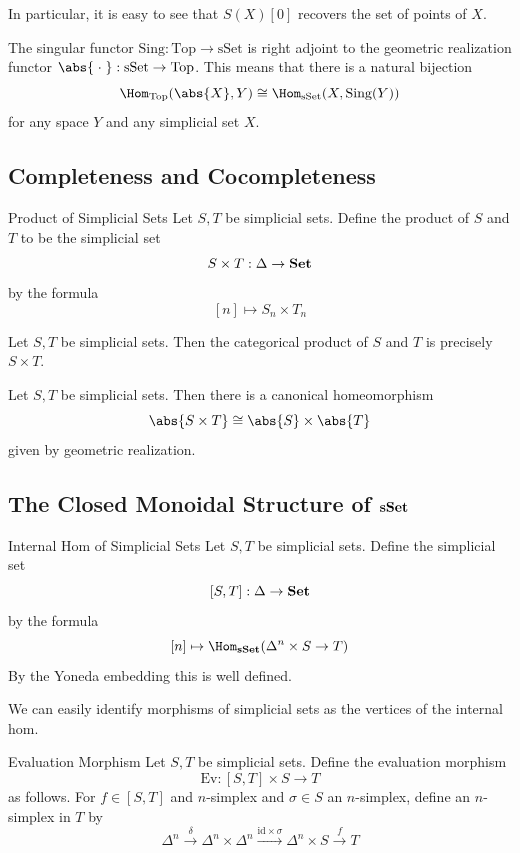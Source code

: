 \documentclass[a4paper]{article}
\begin{document}
In particular, it is easy to see that $S(X)[0]$ recovers the set of points of $X$. 

\begin{thm}{}{} The singular functor $\text{Sing}:\text{Top}\to\text{sSet}$ is right adjoint to the geometric realization functor $\abs{\;\cdot\;}:\text{sSet}\to\text{Top}$. This means that there is a natural bijection $$\Hom_\text{Top}(\abs{X},Y)\cong\Hom_\text{sSet}(X,\text{Sing}(Y))$$ for any space $Y$ and any simplicial set $X$. 
\end{thm}

\subsection{Completeness and Cocompleteness}
\begin{defn}{Product of Simplicial Sets}{} Let $S,T$ be simplicial sets. Define the product of $S$ and $T$ to be the simplicial set $$S\times T:\Delta\to\bold{Set}$$ by the formula $$[n]\mapsto S_n\times T_n$$
\end{defn}

\begin{prp}{}{} Let $S,T$ be simplicial sets. Then the categorical product of $S$ and $T$ is precisely $S\times T$. 
\end{prp}

\begin{lmm}{}{} Let $S,T$ be simplicial sets. Then there is a canonical homeomorphism $$\abs{S\times T}\cong\abs{S}\times\abs{T}$$ given by geometric realization. 
\end{lmm}

\subsection{The Closed Monoidal Structure of $\bold{sSet}$}
\begin{defn}{Internal Hom of Simplicial Sets}{} Let $S,T$ be simplicial sets. Define the simplicial set $$[S,T]:\Delta\to\bold{Set}$$ by the formula $$[n]\mapsto\Hom_\bold{sSet}(\Delta^n\times S\to T)$$ By the Yoneda embedding this is well defined. 
\end{defn}

We can easily identify morphisms of simplicial sets as the vertices of the internal hom. 

\begin{defn}{Evaluation Morphism}{} Let $S,T$ be simplicial sets. Define the evaluation morphism $$\text{Ev}:[S,T]\times S\to T$$ as follows. For $f\in[S,T]$ and $n$-simplex and $\sigma\in S$ an $n$-simplex, define an $n$-simplex in $T$ by $$\Delta^n\overset{\delta}{\rightarrow}\Delta^n\times\Delta^n\overset{\text{id}\times\sigma}{\rightarrow}\Delta^n\times S\overset{f}{\rightarrow}T$$
\end{defn}
\end{document}
